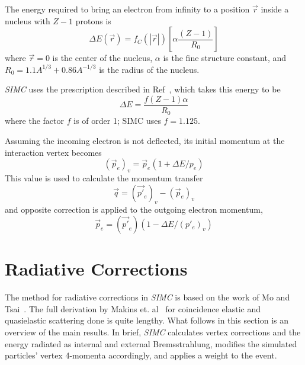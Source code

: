 The energy required to bring an electron from infinity to a position $\vec{r}$
inside a nucleus with $Z-1$ protons is
\begin{equation}
    \Delta E(\vec{r})=f_{C}(|\vec{r}|)\left[\alpha \frac{(Z-1)}{R_{0}}\right]
\end{equation}
where
$\vec{r}=0$ is the center of the nucleus,
$\alpha$ is the fine structure constant,
and
$R_0=1.1 A^{1/3}+0.86 A^{-1/3}$ is the radius of the nucleus.


\textit{SIMC} uses the prescription described in Ref~\cite{Aste_2005}, which
takes this energy to be
\begin{equation}
    \Delta E = \frac{f(Z-1)\alpha}{R_0}
\end{equation}
where the factor $f$ is of order 1; SIMC uses $f=1.125$.


Assuming the incoming electron is not deflected, its initial momentum at the
interaction vertex becomes
\begin{equation}
    (\vec{p}_e)_v = \vec{p}_e(1 + \Delta E / p_e)
\end{equation}
This value is used to calculate the momentum transfer
\begin{equation}
    \vec{q} = (\vec{p'}_e)_v - (\vec{p}_e)_v
\end{equation}
and opposite correction is applied to the outgoing electron momentum,
\begin{equation}
    \vec{p}_e = (\vec{p'}_e)(1 - \Delta E / (p'_e)_v)
\end{equation}




\section{Radiative Corrections}
The method for radiative corrections in \textit{SIMC} is based on the work of
Mo and Tsai~\cite{Mo_1969}.
The full derivation by Makins et. al~\cite{Ent_2001, Makins_1994} for
coincidence elastic and quasielastic scattering done is quite lengthy.
What follows in this section is an overview of the main results.
In brief, \textit{SIMC} calculates vertex corrections and the energy radiated
as internal and external Bremsstrahlung, modifies the simulated particles'
vertex 4-momenta accordingly, and applies a weight to the event.

